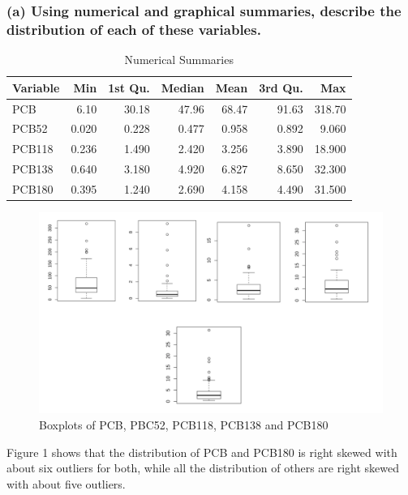 \documentclass[11pt]{article}
\begin{document}
\subsubsection*{(a) Using numerical and graphical summaries, describe the distribution of each of these variables.}
\label{sec:orgbadd59e}
\begin{table}[htbp]
\caption{Numerical Summaries}
\centering
\begin{tabular}{lrrrrrr}
Variable & Min & 1st Qu. & Median & Mean & 3rd Qu. & Max\\
\hline
PCB & 6.10 & 30.18 & 47.96 & 68.47 & 91.63 & 318.70\\
PCB52 & 0.020 & 0.228 & 0.477 & 0.958 & 0.892 & 9.060\\
PCB118 & 0.236 & 1.490 & 2.420 & 3.256 & 3.890 & 18.900\\
PCB138 & 0.640 & 3.180 & 4.920 & 6.827 & 8.650 & 32.300\\
PCB180 & 0.395 & 1.240 & 2.690 & 4.158 & 4.490 & 31.500\\
\end{tabular}
\end{table}

\begin{figure}[htbp]
\centering
\includegraphics[width=.9\linewidth]{./graphs/image1.png}
\caption{Boxplots of PCB, PBC52, PCB118, PCB138 and PCB180}
\end{figure}
Figure 1 shows that the distribution of PCB and PCB180 is right skewed with about six outliers for both, while all the distribution of others are right skewed with about five outliers.  
\end{document}
